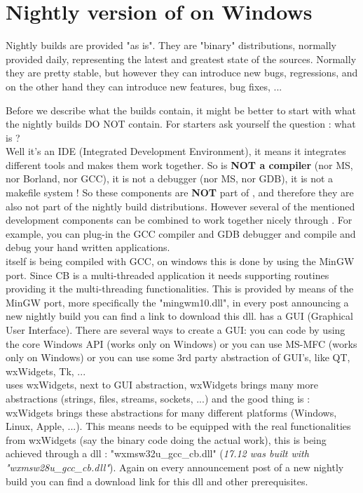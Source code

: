 \section{Nightly version of \codeblocks on Windows}

Nightly builds are provided "as is". They are "binary" distributions, normally provided daily, representing the latest and greatest state of the \codeblocks sources. Normally they are pretty stable, but however they can introduce new bugs, regressions, and on the other hand they can introduce new features, bug fixes, ...

Before we describe what the builds contain, it might be better to start with what the nightly builds DO NOT contain. For starters ask yourself the question : what is \codeblocks ?\\
Well it's an IDE (Integrated Development Environment), it means it integrates different tools and makes them work together. So \codeblocks is \textbf{NOT a compiler} (nor MS, nor Borland, nor GCC), it is not a debugger (nor MS, nor GDB), it is not a makefile system ! So these components are \textbf{NOT} part of \codeblocks, and therefore they are also not part of the nightly build distributions. However several of the mentioned development components can be combined to work together nicely through \codeblocks. For example, you can plug-in the GCC compiler and GDB debugger and compile and debug your hand written applications.\\
\codeblocks itself is being compiled with GCC, on windows this is done by using the MinGW port. Since CB is a multi-threaded application it needs supporting routines providing it the multi-threading functionalities. This is provided by means of the MinGW port, more specifically the "mingwm10.dll", in every post announcing a new nightly build you can find a link to download this dll.
\codeblocks has a GUI (Graphical User Interface). There are several ways to create a GUI: you can code by using the core Windows API (works only on Windows) or you can use MS-MFC (works only on Windows) or you can use some 3rd party abstraction of GUI's, like QT, wxWidgets, Tk, ...\\
\codeblocks uses wxWidgets, next to GUI abstraction, wxWidgets brings many more abstractions (strings, files, streams, sockets, ...) and the good thing is : wxWidgets brings these abstractions for many different platforms (Windows, Linux, Apple, ...). This means \codeblocks needs to be equipped with the real functionalities from wxWidgets (say the binary code doing the actual work), this is being achieved through a dll : "wxmsw32u\_gcc\_cb.dll" (\textit{17.12 was built with "wxmsw28u\_gcc\_cb.dll"}). Again on every announcement post of a new nightly build you can find a download link for this dll and other prerequisites.

